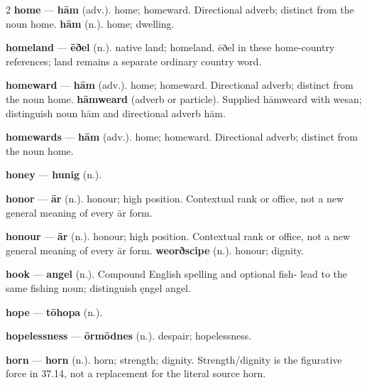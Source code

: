 \begin{multicols}{2}
\textbf{home} — \textbf{hām} (adv.). home; homeward. Directional adverb; distinct from the noun home. \textbf{hām} (n.). home; dwelling.\par
\textbf{homeland} — \textbf{ēðel} (n.). native land; homeland. ēðel in these home-country references; land remains a separate ordinary country word.\par
\textbf{homeward} — \textbf{hām} (adv.). home; homeward. Directional adverb; distinct from the noun home. \textbf{hāmweard} (adverb or particle). Supplied hāmweard with wesan; distinguish noun hām and directional adverb hām.\par
\textbf{homewards} — \textbf{hām} (adv.). home; homeward. Directional adverb; distinct from the noun home.\par
\textbf{honey} — \textbf{hunig} (n.).\par
\textbf{honor} — \textbf{ār} (n.). honour; high position. Contextual rank or office, not a new general meaning of every ār form.\par
\textbf{honour} — \textbf{ār} (n.). honour; high position. Contextual rank or office, not a new general meaning of every ār form. \textbf{weorðscipe} (n.). honour; dignity.\par
\textbf{hook} — \textbf{angel} (n.). Compound English spelling and optional fish- lead to the same fishing noun; distinguish ęngel angel.\par
\textbf{hope} — \textbf{tōhopa} (n.).\par
\textbf{hopelessness} — \textbf{ōrmōdnes} (n.). despair; hopelessness.\par
\textbf{horn} — \textbf{horn} (n.). horn; strength; dignity. Strength/dignity is the figurative force in 37.14, not a replacement for the literal source horn.\par

\end{multicols}

